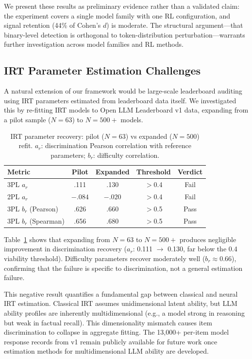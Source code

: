 \documentclass[11pt,a4paper]{article}
\begin{document}
We present these results as preliminary evidence rather than a validated claim: the experiment covers a single model family with one RL configuration, and signal retention (44\% of Cohen's $d$) is moderate.
The structural argument---that binary-level detection is orthogonal to token-distribution perturbation---warrants further investigation across model families and RL methods.

\subsection{IRT Parameter Estimation Challenges}
\label{sec:irt-refit}

A natural extension of our framework would be large-scale leaderboard auditing using IRT parameters estimated from leaderboard data itself.
We investigated this by re-fitting IRT models to Open LLM Leaderboard v1 data, expanding from a pilot sample ($N=63$) to $N=500+$ models.

\begin{table}[t]
\centering
\caption{IRT parameter recovery: pilot ($N=63$) vs expanded ($N=500$) refit. $a_r$: discrimination Pearson correlation with reference parameters; $b_r$: difficulty correlation.}
\label{tab:irt-refit}
\small
\begin{tabular}{lcccc}
\toprule
Metric & Pilot & Expanded & Threshold & Verdict \\
\midrule
3PL $a_r$ & .111 & .130 & $>$0.4 & Fail \\
2PL $a_r$ & $-.084$ & $-.020$ & $>$0.4 & Fail \\
3PL $b_r$ (Pearson) & .626 & .660 & $>$0.5 & Pass \\
3PL $b_r$ (Spearman) & .656 & .680 & $>$0.5 & Pass \\
\bottomrule
\end{tabular}
\end{table}

Table~\ref{tab:irt-refit} shows that expanding from $N=63$ to $N=500+$ produces negligible improvement in discrimination recovery ($a_r$: 0.111 $\to$ 0.130, far below the 0.4 viability threshold).
Difficulty parameters recover moderately well ($b_r \approx 0.66$), confirming that the failure is specific to discrimination, not a general estimation failure.

This negative result quantifies a fundamental gap between classical and neural IRT estimation.
Classical IRT assumes unidimensional latent ability, but LLM ability profiles are inherently multidimensional (e.g., a model strong in reasoning but weak in factual recall).
This dimensionality mismatch causes item discrimination to collapse in aggregate fitting.
The 13,000+ per-item model response records from v1 remain publicly available for future work once estimation methods for multidimensional LLM ability are developed.
\end{document}
